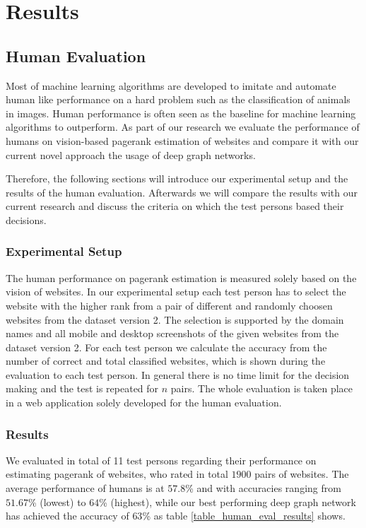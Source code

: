 \section{Results}

\subsection{Human Evaluation}
Most of machine learning algorithms are developed to imitate and automate human like performance on a hard problem such as the classification of animals in images. Human performance is often seen as the baseline for machine learning algorithms to outperform. As part of our research we evaluate the performance of humans on vision-based pagerank estimation of websites and compare it with our current novel approach the usage of deep graph networks. 

Therefore, the following sections will introduce our experimental setup and the results of the human evaluation. Afterwards we will compare the results with our current research and discuss the criteria on which the test persons based their decisions.

\subsubsection{Experimental Setup} 
The human performance on pagerank estimation is measured solely based on the vision of websites. In our experimental setup each test person has to select the website with the higher rank from a pair of different and randomly choosen websites from the dataset version 2. The selection is supported by the domain names and all mobile and desktop screenshots of the given websites from the dataset version 2. For each test person we calculate the accuracy from the number of correct and total classified websites, which is shown during the evaluation to each test person. In general there is no time limit for the decision making and the test is repeated for $n$ pairs. The whole evaluation is taken place in a web application solely developed for the human evaluation.

\subsubsection{Results}
We evaluated in total of 11 test persons regarding their performance on estimating pagerank of websites, who rated in total $1900$ pairs of websites. The average performance of humans is at $57.8$\% and with accuracies ranging from $51.67$\% (lowest) to $64$\% (highest), while our best performing deep graph network has achieved the accuracy of $63$\% as table \ref{table_human_eval_results} shows.

